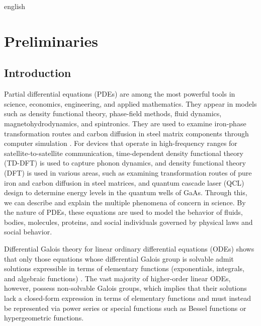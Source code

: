 \documentclass[12pt,letterpaper,twoside]{book}
\newif\ifreviewmode
\newcommand{\revtag}[2]{\ifreviewmode{\color{red!70!black}\textsf{\footnotesize[#1#2]}}\fi}
\newcommand{\verificar}[1]{\revtag{VERIFICAR}{: #1}}
\newcommand{\sinfuente}[1]{\revtag{SIN\_FUENTE}{: #1}}
\begin{document}
\begin{hyphenrules}{english}

\chapter{Preliminaries}\label{ch:preliminaries}

\section{Introduction}

Partial differential equations (PDEs) are among the most powerful tools in science, economics,
engineering, and applied mathematics. They appear in models such as density functional theory,
phase-field methods, fluid dynamics, magnetohydrodynamics, and spintronics. They are used to
examine iron-phase transformation routes and carbon diffusion in steel matrix components through
computer simulation \cite{vandergiessen2020}. For devices that operate in high-frequency ranges
for satellite-to-satellite communication, time-dependent density functional theory (TD-DFT) is used
to capture phonon dynamics, and density functional theory (DFT) is used in various areas, such as
examining transformation routes of pure iron and carbon diffusion in steel matrices, and quantum
cascade laser (QCL) design to determine energy levels in the quantum wells of GaAs.\sinfuente{TD-DFT, QCL}
Through this, we can describe and explain the multiple phenomena of concern in science. By the nature
of PDEs, these equations are used to model the behavior of fluids, bodies, molecules, proteins, and
social individuals governed by physical laws and social behavior.

Differential Galois theory for linear ordinary differential equations (ODEs) shows that only those
equations whose differential Galois group is solvable admit solutions expressible in terms of
elementary functions (exponentials, integrals, and algebraic functions)
\cite{vanderput2003}. The vast majority of higher-order linear ODEs, however, possess
non-solvable Galois groups, which implies that their solutions lack a closed-form expression in terms
of elementary functions and must instead be represented via power series or special functions such as
Bessel functions or hypergeometric functions.\verificar{source for this claim; Iserles (2009) is a
numerical-analysis book}


\end{hyphenrules}
\end{document}
